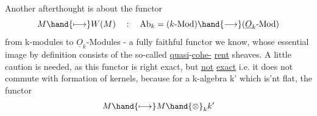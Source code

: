 Another afterthought is about the functor
\[ M \hand{\longmapsto} W(M) \quad : \quad \mathrm{Ab}_k =(k\text{-Mod}) \hand{\longrightarrow} (\underline{O}_k\text{-Mod}) \]
from k-modules to  $\underline{O}_k$-Modules - a fully faithful functor we know,
whose essential image by definition consists of the so-called \uline{quasi}-\uline{cohe-}%
\uline{rent} sheaves. A little caution is needed, as this functor is right
exact, but \uline{not} \uline{exact} i.e. it does not commute with formation of kernels,
because for a k-algebra k' which is'nt flat, the functor
\[ M \hand{\longmapsto} M\hand{\otimes}_k k' \]


